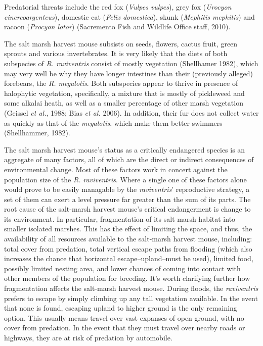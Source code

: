 \documentclass[a4paper]{article}
\begin{document}
Predatorial threats include the red fox (\textit{Vulpes vulpes}), grey fox (\textit{Urocyon cinereoargenteus}), domestic cat (\textit{Felix domestica}), skunk (\textit{Mephitis mephitis}) and racoon (\textit{Procyon lotor}) (Sacremento Fish and Wildlife Office staff, 2010).

The salt marsh harvest mouse subsists on seeds, flowers, cactus fruit, green sprouts and various invertebrates. It is very likely that the diets of both subspecies of \textit{R. raviventris} consist of mostly vegetation (Shellhamer 1982), which may very well be why they have longer intestines than their (previously alleged) forebears, the \textit{R. megalotis}. Both subspecies appear to thrive in presence of halophytic vegetation, specifically, a mixture that is mostly of pickleweed and some alkalai heath, as well as a smaller percentage of other marsh vegetation (Geissel \textit{et al.}, 1988; Bias \textit{et al.} 2006). In addition, their fur does not collect water as quickly as that of the \textit{megalotis}, which make them better swimmers (Shellhammer, 1982).

The salt marsh harvest mouse's status as a critically endangered species is an aggregate of many factors, all of which are the direct or indirect consequences of environmental change. Most of these factors work in concert against the population size of the \textit{R. raviventris}. Where a single one of these factors alone would prove to be easily managable by the \textit{raviventris}' reproductive strategy, a set of them can exert a level pressure far greater than the sum of its parts. The root cause of the salt-marsh harvest mouse's critical endangerment is change to its environment. In particular, fragmentation of its salt marsh habitat into smaller isolated marshes. This has the effect of limiting the space, and thus, the availability of all resources available to the salt-marsh harvest mouse, including: total cover from predation, total vertical escape paths from flooding (which also increases the chance that horizontal escape--upland--must be used), limited food, possibly limited nesting area, and lower chances of coming into contact with other members of the population for breeding. It's worth clarifying further how fragmentation affects the salt-marsh  harvest mouse. During floods, the \textit{raviventris} prefers to escape by simply climbing up any tall vegetation available. In the event that none is found, escaping upland to higher ground is the only remaining option. This usually means travel over vast expanses of open ground, with no cover from predation. In the event that they must travel over nearby roads or highways, they are at risk of predation by automobile.
\end{document}
